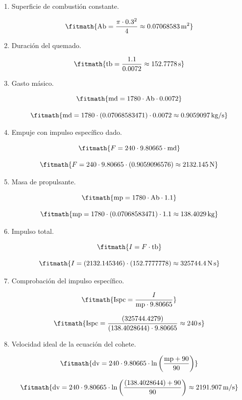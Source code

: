 \begin{enumerate}

\item Superficie de combustión constante.

\[\fitmath{\mathrm{Ab}=\frac{\pi\cdot {0.3}^{2}}{4}\approx 0.07068583\,\mathrm{m^{2}}}\]

\item Duración del quemado.

\[\fitmath{\mathrm{tb}=\frac{1.1}{0.0072}\approx 152.7778\,\mathrm{s}}\]

\item Gasto másico.

\[\fitmath{\mathrm{md}=1780\cdot \mathrm{Ab}\cdot 0.0072}\]

\[\fitmath{\mathrm{md}=1780\cdot (0.07068583471)\cdot 0.0072\approx 0.9059097\,\mathrm{kg/s}}\]

\item Empuje con impulso específico dado.

\[\fitmath{F=240\cdot 9.80665\cdot \mathrm{md}}\]

\[\fitmath{F=240\cdot 9.80665\cdot (0.9059096576)\approx 2132.145\,\mathrm{N}}\]

\item Masa de propulsante.

\[\fitmath{\mathrm{mp}=1780\cdot \mathrm{Ab}\cdot 1.1}\]

\[\fitmath{\mathrm{mp}=1780\cdot (0.07068583471)\cdot 1.1\approx 138.4029\,\mathrm{kg}}\]

\item Impulso total.

\[\fitmath{I=F\cdot \mathrm{tb}}\]

\[\fitmath{I=(2132.145346)\cdot (152.7777778)\approx 325744.4\,\mathrm{N\,s}}\]

\item Comprobación del impulso específico.

\[\fitmath{\mathrm{Ispc}=\frac{I}{\mathrm{mp}\cdot 9.80665}}\]

\[\fitmath{\mathrm{Ispc}=\frac{(325744.4279)}{(138.4028644)\cdot 9.80665}\approx 240\,\mathrm{s}}\]

\item Velocidad ideal de la ecuación del cohete.

\[\fitmath{\mathrm{dv}=240\cdot 9.80665\cdot \ln\left(\frac{\mathrm{mp}+90}{90}\right)}\]

\[\fitmath{\mathrm{dv}=240\cdot 9.80665\cdot \ln\left(\frac{(138.4028644)+90}{90}\right)\approx 2191.907\,\mathrm{m/s}}\]

\end{enumerate}

